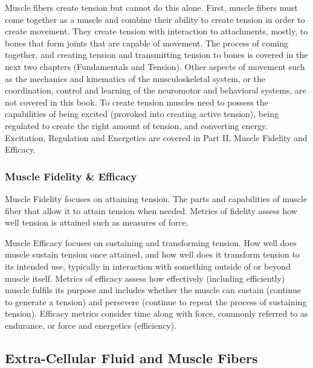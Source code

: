 Muscle fibers create tension but cannot do this alone.  First, muscle fibers must come together as a muscle and combine their ability to create tension in order to create movement. They create tension with interaction to attachments, mostly, to bones\footnotemark{} that form joints that are capable of movement. The process of coming together, and creating tension and transmitting tension to bones is covered in the next two chapters (Fundamentals and Tension). Other aspects of movement such as the mechanics and kinematics of the musculoskeletal system, or the coordination, control and learning of the neuromotor and behavioral systems, are not covered in this book. To create tension muscles need to possess the capabilities of being excited (provoked into creating active tension), being regulated to create the right amount of tension, and converting energy. Excitation, Regulation and Energetics are covered in Part II, Muscle Fidelity and Efficacy. 

\subsubsection{Muscle Fidelity \& Efficacy}

Muscle Fidelity focuses on attaining tension. The parts and capabilities of muscle fiber that allow it to attain tension when needed. Metrics of fidelity assess how well tension is attained such as measures of force.

Muscle Efficacy focuses on sustaining and transforming tension. How well does muscle sustain tension once attained, and how well does it transform tension to its intended use, typically in interaction with something outside of or beyond muscle itself. Metrics of efficacy assess how effectively (including efficiently) muscle fulfils its purpose and includes whether the muscle can sustain (continue to generate a tension) and persevere (continue to repeat the process of sustaining tension). Efficacy metrics consider time along with force, commonly referred to as endurance, or force and energetics (efficiency). 

\subsection{Extra-Cellular Fluid and Muscle Fibers}


